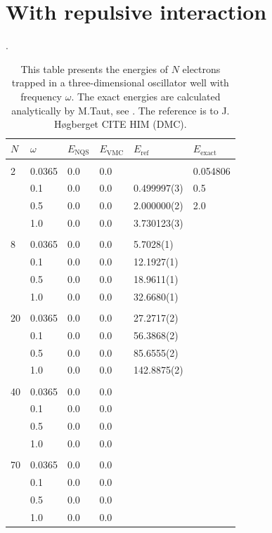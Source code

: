 \section{With repulsive interaction}
\begin{table} [H]
	\caption{This table presents the energies of $N$ electrons trapped in a three-dimensional oscillator well with frequency $\omega$. The exact energies are calculated analytically by M.Taut, see \cite{taut_two_1993}. The reference is to J. Høgberget CITE HIM (DMC). }. 
	\begin{tabularx}{\textwidth}{X:X|XXXX} \hline\hline
		\label{tab:quantumdotswinteraction3D}
		$N$ & $\omega$ & $E_{\text{NQS}}$ & $E_{\text{VMC}}$ & $E_{\text{ref}} $ & $E_{\text{exact}}$ \\ \hline \\
		2 & 0.0365 & 0.0 & 0.0 &  & 0.054806 \\ 
		& 0.1 & 0.0 & 0.0 & 0.499997(3) & 0.5 \\
		& 0.5 & 0.0 & 0.0 & 2.000000(2) & 2.0 \\
		& 1.0 & 0.0 & 0.0 & 3.730123(3) &  \\ \hdashline \\
		
		8 & 0.0365 & 0.0 & 0.0 & 5.7028(1) \\ 
		& 0.1 & 0.0 & 0.0 & 12.1927(1) \\
		& 0.5 & 0.0 & 0.0 & 18.9611(1) \\
		& 1.0 & 0.0 & 0.0 & 32.6680(1) \\ \hdashline \\
		
		20 & 0.0365 & 0.0 & 0.0 & 27.2717(2) \\ 
		& 0.1 & 0.0 & 0.0 & 56.3868(2) \\
		& 0.5 & 0.0 & 0.0 & 85.6555(2) \\
		& 1.0 & 0.0 & 0.0 & 142.8875(2) \\ \hdashline \\
		
		40 & 0.0365 & 0.0 & 0.0 \\ 
		& 0.1 & 0.0 & 0.0 \\
		& 0.5 & 0.0 & 0.0 \\
		& 1.0 & 0.0 & 0.0 \\ \hdashline \\
		
		70 & 0.0365 & 0.0 & 0.0 \\ 
		& 0.1 & 0.0 & 0.0 \\
		& 0.5 & 0.0 & 0.0 \\
		& 1.0 & 0.0 & 0.0 \\ \hline\hline
	\end{tabularx}
\end{table}
